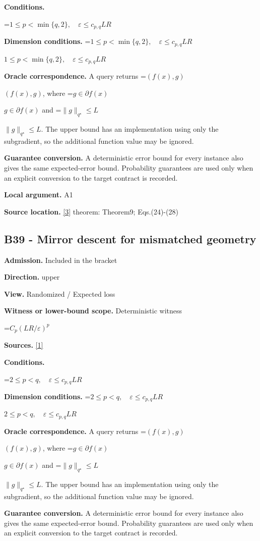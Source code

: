 \documentclass[10pt,a4paper]{article}
\newcommand{\AtlasMath}[1]{\par\begingroup\centering\setbox0=\hbox{$\displaystyle #1$}\ifdim\wd0>1.4\linewidth\typeout{ATLAS WIDE FORMULA: \the\wd0}\fi\ifdim\wd0>\linewidth\resizebox{\linewidth}{!}{\box0}\else\box0\fi\par\endgroup}
\newcommand{\AtlasInlineMath}[1]{\begingroup\setbox0=\hbox{$#1$}\ifdim\wd0>.4\linewidth\endgroup\AtlasMath{#1}\else\endgroup$#1$\fi}
\begin{document}
\textbf{Conditions.} 
\AtlasMath{1\le p<\min\{q,2\},\quad\varepsilon\le c_{p,q}LR}


\textbf{Dimension conditions.} \AtlasInlineMath{1\le p<\min\{q,2\},\quad\varepsilon\le c_{p,q}LR}

\textbf{Oracle correspondence.} A query returns \AtlasInlineMath{(f(x),g)}, where \AtlasInlineMath{g\in\partial f(x)} and \AtlasInlineMath{\|g\|_{q^\star}\le L}. The upper bound has an implementation using only the subgradient, so the additional function value may be ignored.

\textbf{Guarantee conversion.} A deterministic error bound for every instance also gives the same expected-error bound. Probability guarantees are used only when an explicit conversion to the target contract is recorded.

\textbf{Local argument.} A1

\textbf{Source location.} \href{https://arxiv.org/pdf/2609.20701}{[3]} theorem: Theorem9; Eqs.(24)-(28)

\subsection{B39 - Mirror descent for mismatched geometry}
\textbf{Admission.} Included in the bracket

\textbf{Direction.} upper

\textbf{View.} Randomized / Expected loss

\textbf{Witness or lower-bound scope.} Deterministic witness

\AtlasMath{C_p(LR/\varepsilon)^p}
\textbf{Sources.} \href{https://arxiv.org/pdf/1107.4080}{[1]}

\textbf{Conditions.} 
\AtlasMath{2\le p<q,\quad\varepsilon\le c_{p,q}LR}


\textbf{Dimension conditions.} \AtlasInlineMath{2\le p<q,\quad\varepsilon\le c_{p,q}LR}

\textbf{Oracle correspondence.} A query returns \AtlasInlineMath{(f(x),g)}, where \AtlasInlineMath{g\in\partial f(x)} and \AtlasInlineMath{\|g\|_{q^\star}\le L}. The upper bound has an implementation using only the subgradient, so the additional function value may be ignored.

\textbf{Guarantee conversion.} A deterministic error bound for every instance also gives the same expected-error bound. Probability guarantees are used only when an explicit conversion to the target contract is recorded.
\end{document}
